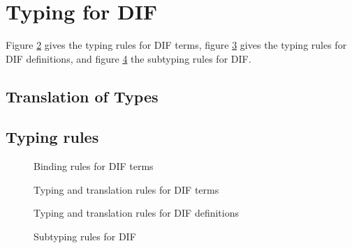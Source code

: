 \section{Typing for DIF}
Figure \ref{typing_rules_terms} gives the typing rules for DIF terms, figure
\ref{typing_rules_definitions} gives the typing rules for DIF definitions, and
figure \ref{subtyping_rules} the subtyping rules for DIF.

\subsection{Translation of Types}

\begin{DEFINITION}
    
    \label{translation}
\end{DEFINITION}

\subsection{Typing rules}

\begin{figure}[h]
    
    \caption{Binding rules for DIF terms}
    \label{binding_rules}
\end{figure}

\begin{figure}[h]
    
    \caption{Typing and translation rules for DIF terms}
    \label{typing_rules_terms}
\end{figure}

\begin{figure}[h]
    
    \caption{Typing and translation rules for DIF definitions}
    \label{typing_rules_definitions}
\end{figure}

\begin{figure}[h]
    
    \caption{Subtyping rules for DIF}
    \label{subtyping_rules}
\end{figure}

